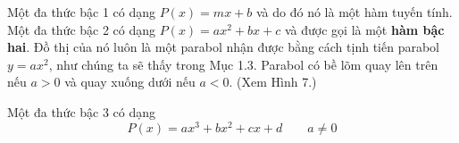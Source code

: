 \begin{minipage}[t]{0.708\textwidth}
    Một đa thức bậc 1 có dạng $P(x) = mx + b$ và do đó nó là một hàm tuyến tính. Một đa thức bậc 2 có dạng $P(x) = ax^2 + bx + c$ và được gọi là một \textbf{hàm bậc hai}. Đồ thị của nó luôn là một parabol nhận được bằng cách tịnh tiến parabol $y = ax^2$, như chúng ta sẽ thấy trong Mục 1.3. Parabol có bề lõm quay lên trên nếu $a > 0$ và quay xuống dưới nếu $a < 0$. (Xem Hình 7.)

    Một đa thức bậc 3 có dạng
    \[
    P(x) = ax^3 + bx^2 + cx + d \qquad a \neq 0
    \]
\end{minipage}
